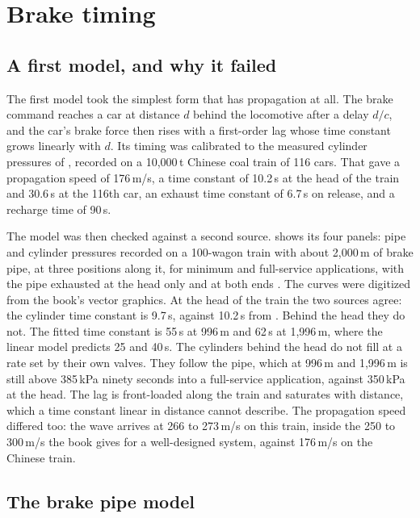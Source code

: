 \section{Brake timing}
\label{sec:v3_brake_timing}

\subsection{A first model, and why it failed}

The first model took the simplest form that has propagation at all. The brake command reaches a car at distance $d$ behind the locomotive after a delay $d/c$, and the car's brake force then rises with a first-order lag whose time constant grows linearly with $d$. Its timing was calibrated to the measured cylinder pressures of \cite{Wei2017AirBrake}, recorded on a 10,000\,t Chinese coal train of 116 cars. That gave a propagation speed of 176\,m/s, a time constant of 10.2\,s at the head of the train and 30.6\,s at the 116th car, an exhaust time constant of 6.7\,s on release, and a recharge time of 90\,s.

The model was then checked against a second source.  shows its four panels: pipe and cylinder pressures recorded on a 100-wagon train with about 2,000\,m of brake pipe, at three positions along it, for minimum and full-service applications, with the pipe exhausted at the head only and at both ends \cite[Figs.~5.67--5.68]{Spiryagin2017HeavyHaul}. The curves were digitized from the book's vector graphics. At the head of the train the two sources agree: the cylinder time constant is 9.7\,s, against 10.2\,s from \cite{Wei2017AirBrake}. Behind the head they do not. The fitted time constant is 55\,s at 996\,m and 62\,s at 1,996\,m, where the linear model predicts 25 and 40\,s. The cylinders behind the head do not fill at a rate set by their own valves. They follow the pipe, which at 996\,m and 1,996\,m is still above 385\,kPa ninety seconds into a full-service application, against 350\,kPa at the head. The lag is front-loaded along the train and saturates with distance, which a time constant linear in distance cannot describe. The propagation speed differed too: the wave arrives at 266 to 273\,m/s on this train, inside the 250 to 300\,m/s the book gives for a well-designed system, against 176\,m/s on the Chinese train.

\subsection{The brake pipe model}

